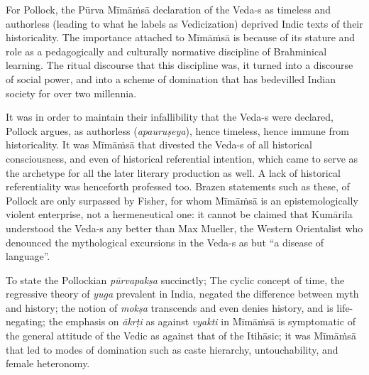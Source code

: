 For Pollock, the Pūrva Mīmāṁsā declaration of the Veda-s as timeless and authorless (leading to what he labels as Vedicization) deprived Indic texts of their historicality. The importance attached to Mīmāṁsā is because of its stature and role as a pedagogically and culturally normative discipline of Brahminical learning. The ritual discourse that this discipline was, it turned into a discourse of social power, and into a scheme of domination that has bedevilled Indian society for over two millennia.

It was in order to maintain their infallibility that the Veda-s were declared, Pollock argues, as authorless (\textit{apauruṣeya}), hence timeless, hence immune from historicality. It was Mīmāṁsā that divested the Veda-s of all historical consciousness, and even of historical referential intention, which came to serve as the archetype for all the later literary production as well. A lack of historical referentiality was henceforth professed too. Brazen statements such as these, of Pollock are only surpassed by Fisher, for whom Mīmāṁsā is an epistemologically violent enterprise, not a hermeneutical one: it cannot be claimed that Kumārila understood the Veda-s any better than Max Mueller, the Western Orientalist who denounced the mythological excursions in the Veda-s as but “a disease of language”. 

To state the Pollockian \textit{pūrvapakṣa} succinctly; The cyclic concept of time, the regressive theory of \textit{yuga} prevalent in India, negated  the difference between myth and history; the notion of \textit{mokṣa} transcends and even denies history, and is life-negating; the emphasis on \textit{ākrṭi} as against \textit{vyakti} in Mīmāṁsā is symptomatic of the general attitude of the Vedic as against that of the Itihāsic; it was Mīmāṁsā that led to modes of domination such as caste hierarchy, untouchability, and female heteronomy.


